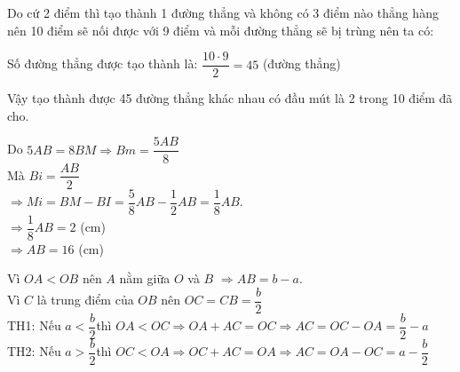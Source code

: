 \begin{Answer}{31}
		Do cứ 2 điểm thì tạo thành 1 đường thẳng và không có 3 điểm nào thẳng hàng nên 10 điểm sẽ nối được với 9 điểm và mỗi đường thẳng sẽ bị trùng nên ta có:
		
		Số đường thẳng được tạo thành là: $\dfrac{10 \cdot 9}{2}=45 $ (đường thẳng)
		
		Vậy tạo thành được 45 đường thẳng khác nhau có đầu mút là 2 trong 10 điểm đã cho.
	
\end{Answer}
\begin{Answer}{32}
		Do $5AB = 8BM \Rightarrow Bm = \dfrac{5AB}{8}$\\
		Mà $Bi = \dfrac{AB}{2}$\\
		$\Rightarrow Mi = BM - BI = \dfrac{5}{8}AB - \dfrac{1}{2}AB = \dfrac{1}{8} AB$.\\
		$\Rightarrow \dfrac{1}{8} AB = 2$ (cm)\\
		$\Rightarrow AB = 16$ (cm)
	
\end{Answer}
\begin{Answer}{33}
		Vì $OA<OB$ nên $A$ nằm giữa $O$ và $B$ $\Rightarrow AB=b-a$.\\
		Vì $C$ là trung điểm của $OB$ nên $OC=CB=\dfrac{b}{2}$\\
		TH1: Nếu $a<\dfrac{b}{2}$thì $OA<OC\Rightarrow OA+AC=OC\Rightarrow AC=OC-OA=\dfrac{b}{2}-a$\\
		TH2: Nếu $a>\dfrac{b}{2}$thì $OC<OA\Rightarrow OC+AC=OA\Rightarrow AC=OA-OC=a-\dfrac{b}{2}$
		\begin{center}
		\end{center}
	
\end{Answer}
